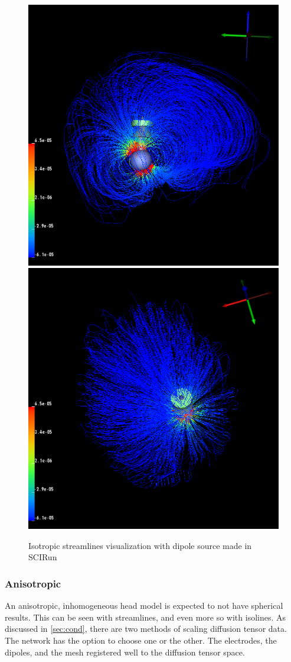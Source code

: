 \begin{figure}[H]
\begin{center}
\includegraphics[width=.49\textwidth]{Figures/iso_streamlines}
\includegraphics[width=.49\textwidth]{Figures/iso_streamlines_top}
\caption{Isotropic streamlines visualization with dipole source made in SCIRun}
\label{fig:isostream}
\end{center}
\end{figure}

\subsubsection{Anisotropic}

An anisotropic, inhomogeneous head model is expected to not have spherical results. This can be seen with streamlines, and even more so with isolines. As discussed in \ref{sec:cond}, there are two methods of scaling diffusion tensor data. The network has the option to choose one or the other. The electrodes, the dipoles, and the mesh registered well to the diffusion tensor space.

